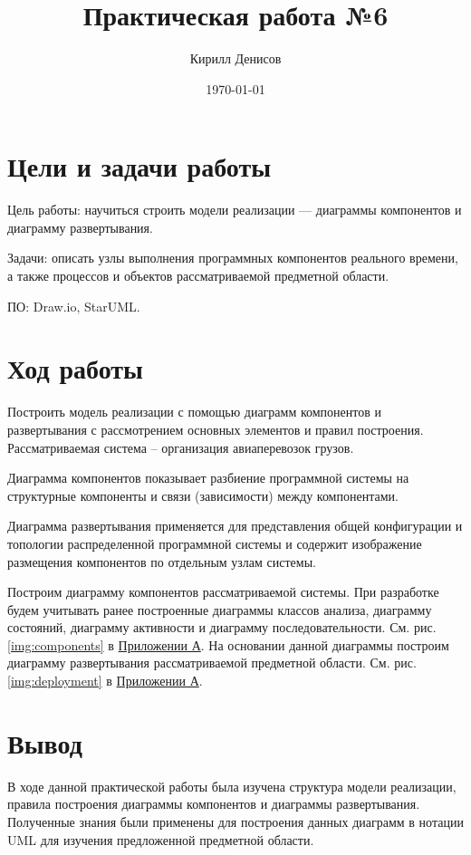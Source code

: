 \documentclass[a4paper,14pt]{extarticle}
\author{Кирилл Денисов}
\title{Практическая работа №6}
\date{\today}
\newcommand{\pathToCommonFolder}{/home/denilai/Desktop/LaTeX/Common}
\begin{document}
\thispagestyle{empty}



\newpage
\tableofcontents
\newpage	
\section{Цели и задачи работы}
Цель работы: научиться строить модели реализации --- диаграммы компонентов и диаграмму развертывания.

Задачи: описать узлы выполнения программных компонентов реального времени, а также процессов и объектов рассматриваемой предметной области.

ПО: Draw.io, StarUML.

\section{Ход работы}

\begin{problem}
	Построить модель реализации с помощью диаграмм компонентов и развертывания с рассмотрением основных элементов и правил построения. Рассматриваемая система – организация авиаперевозок грузов.
\end{problem}
\begin{nonum}
	Диаграмма компонентов показывает разбиение программной системы на структурные компоненты и связи (зависимости) между компонентами. 
			
	Диаграмма развертывания применяется для представления общей конфигурации и топологии распределенной программной системы и содержит изображение размещения компонентов по отдельным узлам системы.

Построим диаграмму компонентов рассматриваемой системы. При разработке будем учитывать ранее построенные диаграммы классов анализа, диаграмму состояний, диаграмму активности и диаграмму последовательности. См. рис. \ref{img:components} в \hyperref[sec:pril]{Приложении А}.
На основании данной диаграммы построим диаграмму развертывания рассматриваемой предметной области. См. рис. \ref{img:deployment}  в \hyperref[sec:pril]{Приложении А}.
\end{nonum}
\section{Вывод}
В ходе данной практической работы была изучена структура модели реализации, правила построения диаграммы компонентов и диаграммы развертывания. Полученные знания были применены для построения данных диаграмм в нотации UML для изучения предложенной предметной области.
\end{document}
